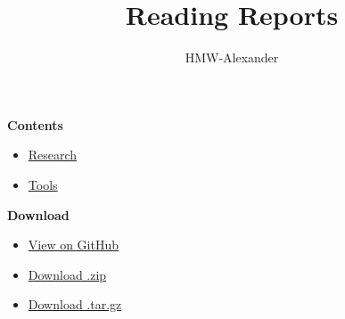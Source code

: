 \documentclass[letterpaper,11pt]{article}
\title{\textbf{Reading Reports}}
\author{HMW-Alexander}
\begin{document}
\maketitle

\textbf{Contents}
\begin{itemize}
	\item \href{./Research/index.html}{Research}
	\item \href{./Tools/index.html}{Tools}
\end{itemize}

\textbf{Download}
\begin{itemize}
	\item \href{https://github.com/MengwenHe-CMU/Reading-Reports}{View on GitHub}
	\item \href{https://github.com/MengwenHe-CMU/Reading-Reports/zipball/master}{Download .zip}
	\item \href{https://github.com/MengwenHe-CMU/Reading-Reports/tarball/master}{Download .tar.gz}
\end{itemize}
	
\end{document}
